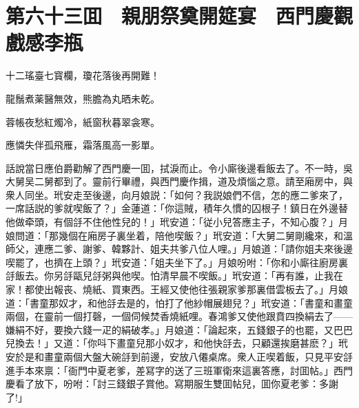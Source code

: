 
\chapter*{第六十三囬　親朋祭奠開筵宴　西門慶觀戲感李瓶}

十二瑤臺七寳欄，瓊花落後再開難！

龍鬚煮薬醫無效，熊膽為丸晒未乾。

蓉帳夜愁紅燭冷，紙窗秋暮翠衾寒。

應憐失伴孤飛雁，霜落風高一影單。

話說當日應伯爵勸解了西門慶一囬，拭淚而止。令小廝後邊看飯去了。不一時，吳大舅吴二舅都到了。靈前行畢禮，與西門慶作揖，道及煩惱之意。請至廂房中，與衆人同坐。玳安走至後邊，向月娘説：「如何？我説娘們不信，怎的應二爹來了，一席話説的爹就喫飯了？」金蓮道：「你這賊，積年久慣的囚根子！鎮日在外邊替他做牵頭，有個㧱不住他性兒的！」玳安道：「従小兒答應主子，不知心腹？」月娘問道：「那幾個在廂房子裏坐着，陪他喫飯？」玳安道：「大舅二舅剛纔來，和溫師父，連應二爹、謝爹、韓夥計、姐夫共爹八位人哩。」月娘道：「請你姐夫來後邊喫罷了，也擠在上頭？」玳安道：「姐夫坐下了。」月娘吩咐：「你和小廝往廚房裏㧱飯去。你另㧱甌兒㧱粥與他喫。怕清早晨不喫飯。」玳安道：「再有誰，止我在家！都使出報丧、燒紙、買東西。王經又使他往張親家爹那裏借雲板去了。」月娘道：「書童那奴才，和他㧱去是的，怕打了他紗帽展翅兒？」玳安道：「書童和畫童兩個，在靈前一個打磬，一個伺候焚香燒紙哩。春鴻爹又使他跟賁四換絹去了——嫌絹不好，要換六錢一疋的絹破孝。」月娘道：「論起來，五錢銀子的也罷，又巴巴兒換去！」又道：「你呌下畫童兒那小奴才，和他快㧱去，只顧還挨磨甚麽？」玳安於是和畫童兩個大盤大碗㧱到前邊，安放八僊桌席。衆人正喫着飯，只見平安㧱進手本來禀：「衙門中夏老爹，差冩字的送了三班軍衛來這裏答應，討囬帖。」西門慶看了放下，吩咐：「討三錢銀子賞他。寫期服生雙囬帖兒，囬你夏老爹：多謝了!」

